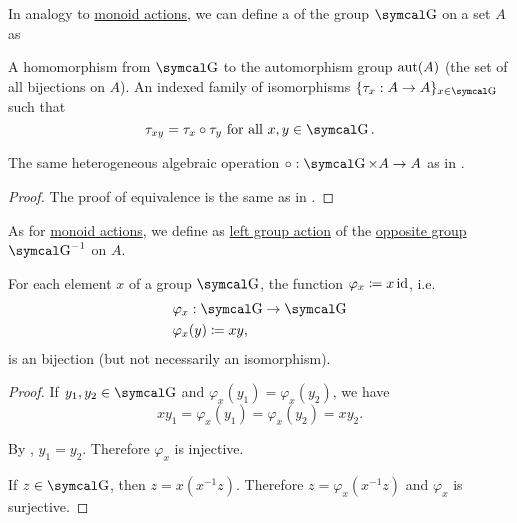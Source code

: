 \begin{definition}\label{def:left_group_action}
  In analogy to \hyperref[def:left_monoid_action]{monoid actions}, we can define a  of the group \( \CG \) on a set \( A \) as
  \begin{DefEnum}
     A homomorphism from \( \CG \) to the automorphism group \( \operatorname{aut}(A) \) (the set of all bijections on \( A \)).
     An indexed family of isomorphisms \( \{ \tau_x: A \to A \}_{x \in \CG} \) such that
    \begin{equation}\label{eq:def:left_group_action/indirect_homomorphism}
      \tau_{xy} = \tau_x \circ \tau_y \T{for all} x, y \in \CG.
    \end{equation}

     The same heterogeneous algebraic operation \( \circ: \CG \times A \to A \) as in .
  \end{DefEnum}
\end{definition}
\begin{proof}
  The proof of equivalence is the same as in .
\end{proof}

\begin{definition}\label{def:right_group_action}
  As for \hyperref[def:right_monoid_action]{monoid actions}, we define  as \hyperref[def:left_group_action]{left group action} of the \hyperref[def:magma/opposite]{opposite group} \( \CG^{-1} \) on \( A \).
\end{definition}

\begin{lemma}\label{thm:group_multiplication_is_bijection}
  For each element \( x \) of a group \( \CG \), the function \( \varphi_x \coloneqq x\operatorname{id} \), i.e.
  \begin{align*}
    &\varphi_x: \CG \to \CG \\
    &\varphi_x(y) \coloneqq xy,
  \end{align*}
  is an bijection (but not necessarily an isomorphism).
\end{lemma}
\begin{proof}
   If \( y_1, y_2 \in \CG \) and \( \varphi_x(y_1) = \varphi_x(y_2) \), we have
  \begin{equation*}
    xy_1 = \varphi_x(y_1) = \varphi_x(y_2) = xy_2.
  \end{equation*}

  By , \( y_1 = y_2 \). Therefore \( \varphi_x \) is injective.

   If \( z \in \CG \), then \( z = x(x^{-1} z) \). Therefore \( z = \varphi_x(x^{-1} z) \) and \( \varphi_x \) is surjective.
\end{proof}

